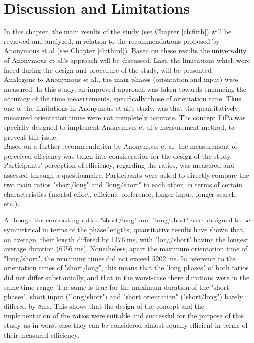 
\chapter{Discussion and Limitations}\label{ch:sixth}

In this chapter, the main results of the study (see Chapter \ref{ch:fifth}) will be reviewed and analyzed, in relation to the recommendations proposed by Anonymous et al \cite{anonymous} (see Chapter \ref{ch:third}). Based on these results the universality of Anonymous et al.'s \cite{anonymous} approach will be discussed. Last, the limitations which were faced during the design and procedure of the study, will be presented.\\



Analogous to Anonymous et al., the main phases (orientation and input) were measured. In this study, an improved approach was taken towards enhancing the accuracy of the time measurements, specifically those of orientation time. Thus one of the limitations in Anonymous et al.'s \cite{anonymous} study, was that the quantitatively measured orientation times were not completely accurate. The concept FiPa was specially designed to implement Anonymous et al.'s \cite{anonymous} measurement method, to prevent this issue. \\
Based on a further recommendation by Anonymous et al. \cite{anonymous} the measurement of perceived efficiency was taken into consideration for the design of the study. Participants' perception of efficiency, regarding the ratios, was measured and assessed through a questionnaire. Participants were asked to directly compare the two main ratios "short/long" and "long/short" to each other, in terms of certain characteristics (mental effort, efficient, preference, longer input, longer search, etc.). 

Although the contrasting ratios "short/long" and "long/short" were designed to be symmetrical in terms of the phase lengths, quantitative results have shown that, on average, their length differed by 1176 ms, with "long/short" having the longest average duration (6056 ms). Nonetheless, apart the maximum orientation time of "long/short", the remaining times did not exceed 5202 ms. In reference to the orientation times of "short/long", this means that the "long phases" of both ratios did not differ substantially, and that in the worst-case there durations were in the same time range. The same is true for the maximum duration of the "short phases". short input ("long/short") and "short orientation" ("short/long") barely differed by 8ms. This shows that the design of the concept and the implementation of the ratios were suitable and successful for the purpose of this study, as in worst case they can be considered almost equally efficient in terms of their measured efficiency. \\

